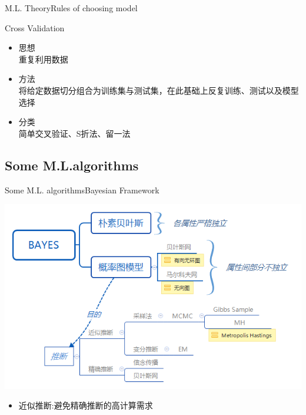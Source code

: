 \documentclass{beamer}
\begin{document}
\begin{frame}{M.L. Theory}{\quad \quad\quad Rules of choosing model}
\begin{block}{Cross Validation}
\begin{itemize}
\item 思想\\重复利用数据
\item 方法\\将给定数据切分组合为训练集与测试集，在此基础上反复训练、测试以及模型选择
\item 分类\\简单交叉验证、S折法、留一法
\end{itemize}
\end{block}
\end{frame}


\subsection{Some M.L.algorithms}

\begin{frame}{Some M.L. algorithms}{\quad \quad \quad Bayesian Framework}

\includegraphics[scale=.45]{fig/Bayes.png}


   \begin{itemize}
  \item 近似推断:避免精确推断的高计算需求
  \end{itemize}

\end{frame}
\end{document}
